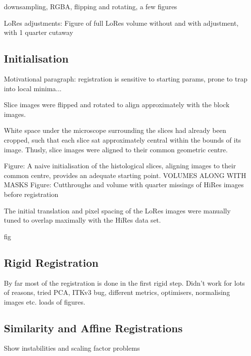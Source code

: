     downsampling, RGBA, flipping and rotating, a few figures
    
    LoRes adjustments:
    Figure of full LoRes volume without and with adjustment, with 1 quarter cutaway
    
  
  \subsection{Initialisation} %
  \label{sub:initialisation}
    Motivational paragraph: registration is sensitive to starting params, prone to trap into local minima...
      
    Slice images were flipped and rotated to align approximately with the block images. 
    
    
    White space under the microscope surrounding the slices had already been cropped, such that each slice sat approximately central within the bounds of its image. Thusly, slice images were aligned to their common geometric centre.
    
    Figure: A naive initialisation of the histological slices, aligning images to their common centre, provides an adequate starting point. VOLUMES ALONG WITH MASKS
    Figure: Cutthroughs and volume with quarter missings of HiRes images before registration
    
    The initial translation and pixel spacing of the LoRes images were manually tuned to overlap maximally with the HiRes data set.
    
  fig
    
  
  \subsection{Rigid Registration} %
  \label{sub:rigid_registration}
    By far most of the registration is done in the first rigid step. Didn't work for lots of reasons, tried PCA, ITKv3 bug, different metrics, optimisers, normalising images etc. loads of figures.
  
  \subsection{Similarity and Affine Registrations} %
  \label{sub:similarity_and_affine_registrations}
    Show instabilities and scaling factor problems
    
